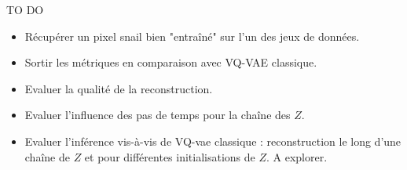 \documentclass{article}
\begin{document}
TO DO 

\begin{itemize}
\item Récupérer un pixel snail bien "entraîné" sur l'un des jeux de données.
\item Sortir les métriques en comparaison avec VQ-VAE classique.
\item Evaluer la qualité de la reconstruction.
\item Evaluer l'influence des pas de temps pour la chaîne des $Z$.
\item Evaluer l'inférence vis-à-vis de VQ-vae classique : reconstruction le long d'une chaîne de $Z$ et pour différentes initialisations de $Z$. A explorer.
\end{itemize}



\clearpage
\newpage
\end{document}
